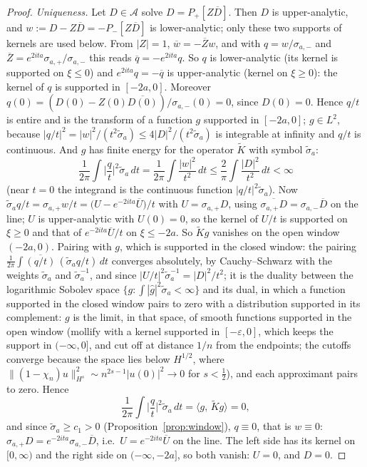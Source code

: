 \documentclass[11pt]{article}
\theoremstyle{definition}
\theoremstyle{remark}
\newcommand{\ip}[2]{\langle #1,\, #2\rangle}
\begin{document}
\begin{proof}
\emph{Uniqueness.} Let $D\in\mathcal A$ solve $D=P_+[Z\overline D]$. Then $D$ is upper-analytic, and $w:=D-Z\overline D=-P_-[Z\overline D]$ is lower-analytic; only these two supports of kernels are used below. From $|Z|=1$, $\overline w=-\overline Zw$, and with $q=w/\sigma_{a,-}$ and $\overline Z=e^{2ita}\sigma_{a,+}/\sigma_{a,-}$ this reads $\overline q=-e^{2ita}q$. So $q$ is lower-analytic (its kernel is supported on $\xi\le0$) and $e^{2ita}q=-\overline q$ is upper-analytic (kernel on $\xi\ge0$): the kernel of $q$ is supported in $[-2a,0]$. Moreover $q(0)=(D(0)-Z(0)\overline{D(0)})/\sigma_{a,-}(0)=0$, since $D(0)=0$. Hence $q/t$ is entire and is the transform of a function $g$ supported in $[-2a,0]$; $g\in L^2$, because $|q/t|^2=|w|^2/(t^2\tilde\sigma_a)\le4|D|^2/(t^2\tilde\sigma_a)$ is integrable at infinity and $q/t$ is continuous. And $g$ has finite energy for the operator $\tilde K$ with symbol $\tilde\sigma_a$:
\[
\frac1{2\pi}\int\Big|\frac qt\Big|^2\tilde\sigma_a\,dt=\frac1{2\pi}\int\frac{|w|^2}{t^2}\,dt\le\frac2\pi\int\frac{|D|^2}{t^2}\,dt<\infty
\]
(near $t=0$ the integrand is the continuous function $|q/t|^2\tilde\sigma_a$). Now $\tilde\sigma_aq/t=\sigma_{a,+}w/t=\big(U-e^{-2ita}\overline U\big)/t$ with $U=\sigma_{a,+}D$, using $\overline{\sigma_{a,+}D}=\sigma_{a,-}\overline D$ on the line; $U$ is upper-analytic with $U(0)=0$, so the kernel of $U/t$ is supported on $\xi\ge0$ and that of $e^{-2ita}\overline U/t$ on $\xi\le-2a$. So $\tilde Kg$ vanishes on the open window $(-2a,0)$. Pairing with $g$, which is supported in the closed window: the pairing $\frac1{2\pi}\int\overline{(q/t)}\,(\tilde\sigma_aq/t)\,dt$ converges absolutely, by Cauchy--Schwarz with the weights $\tilde\sigma_a$ and $\tilde\sigma_a^{-1}$, and since $|U/t|^2\tilde\sigma_a^{-1}=|D|^2/t^2$; it is the duality between the logarithmic Sobolev space $\{g:\int|\hat g|^2\tilde\sigma_a<\infty\}$ and its dual, in which a function supported in the closed window pairs to zero with a distribution supported in its complement: $g$ is the limit, in that space, of smooth functions supported in the open window (mollify with a kernel supported in $[-\varepsilon,0]$, which keeps the support in $(-\infty,0]$, and cut off at distance $1/n$ from the endpoints; the cutoffs converge because the space lies below $H^{1/2}$, where $\|(1-\chi_n)u\|_{H^s}^2\sim n^{2s-1}|u(0)|^2\to0$ for $s<\tfrac12$), and each approximant pairs to zero. Hence
\[
\frac1{2\pi}\int\Big|\frac qt\Big|^2\tilde\sigma_a\,dt=\ip g{\tilde Kg}=0 ,
\]
and since $\tilde\sigma_a\ge c_1>0$ (Proposition~\ref{prop:window}), $q\equiv0$, that is $w\equiv0$: $\sigma_{a,+}D=e^{-2ita}\sigma_{a,-}\overline D$, i.e.\ $U=e^{-2ita}\overline U$ on the line. The left side has its kernel on $[0,\infty)$ and the right side on $(-\infty,-2a]$, so both vanish: $U=0$, and $D=0$.
\end{proof}
\end{document}
